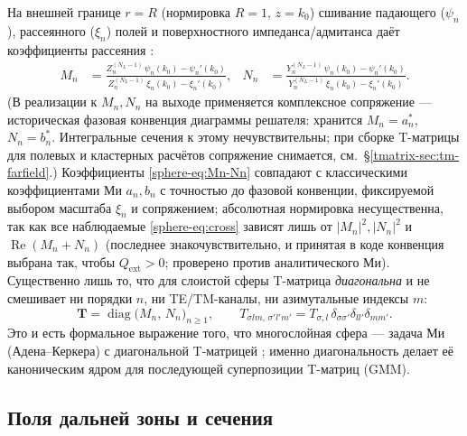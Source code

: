\documentclass[11pt,a4paper]{article}
\begin{document}
На внешней границе $r=R$ (нормировка $R=1$, $z=k_0$) сшивание падающего ($\psi_n$), рассеянного ($\xi_n$) полей и поверхностного импеданса/адмитанса даёт коэффициенты рассеяния \cite{bohren1983,aden1951}:
\begin{align}
M_n &= \frac{Z_n^{(N_L-1)}\,\psi_n(k_0)-\psi_n'(k_0)}{Z_n^{(N_L-1)}\,\xi_n(k_0)-\xi_n'(k_0)},
&
N_n &= \frac{Y_n^{(N_L-1)}\,\psi_n(k_0)-\psi_n'(k_0)}{Y_n^{(N_L-1)}\,\xi_n(k_0)-\xi_n'(k_0)}.
\label{sphere-eq:Mn-Nn}
\end{align}
(В реализации к $M_n,N_n$ на выходе применяется комплексное сопряжение --- историческая фазовая конвенция диаграммы решателя: хранится $M_n=a_n^{*}$, $N_n=b_n^{*}$. Интегральные сечения к этому нечувствительны; при сборке T-матрицы для полевых и кластерных расчётов сопряжение снимается, см.\ \S\ref{tmatrix-sec:tm-farfield}.) Коэффициенты \eqref{sphere-eq:Mn-Nn} совпадают с классическими коэффициентами Ми $a_n,b_n$ \cite{bohren1983} с точностью до фазовой конвенции, фиксируемой выбором масштаба $\xi_n$ и сопряжением; абсолютная нормировка несущественна, так как все наблюдаемые \eqref{sphere-eq:cross} зависят лишь от $|M_n|^2,|N_n|^2$ и $\operatorname{Re}(M_n+N_n)$ (последнее знакочувствительно, и принятая в коде конвенция выбрана так, чтобы $Q_{\text{ext}}>0$; проверено против аналитического Ми). Существенно лишь то, что для слоистой сферы T-матрица \emph{диагональна} и не смешивает ни порядки $n$, ни TE/TM-каналы, ни азимутальные индексы $m$:
\begin{equation}
\bm{T}=\operatorname{diag}\!\big(M_n,\,N_n\big)_{n\ge1},
\qquad
T_{\sigma l m,\,\sigma' l' m'}=T_{\sigma,l}\,\delta_{\sigma\sigma'}\delta_{ll'}\delta_{mm'}.
\label{sphere-eq:Tmatrix}
\end{equation}
Это и есть формальное выражение того, что многослойная сфера --- задача Ми (Адена--Керкера) с диагональной T-матрицей \cite{aden1951,waterman1971,mishchenko2002}; именно диагональность делает её каноническим ядром для последующей суперпозиции T-матриц (GMM).

\subsection{Поля дальней зоны и сечения}
\end{document}

